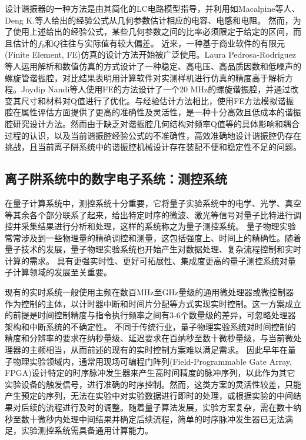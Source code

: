 设计谐振器的一种方法是由其简化的LC电路模型指导，并利用如Macalpine等人\cite[]{Macalpine_Schildknecht_1959}、Deng K.等人\cite[]{Deng_Sun_Yuan_Xu_Zhang_Lu_Luo_2014}给出的经验公式从几何参数估计相应的电容、电感和电阻。
然而，为了使用上述给出的经验公式，某些几何参数之间的比率必须限定于给定的区间，而且估计的$f_0$和$Q$往往与实际值有较大偏差。
近来，一种基于商业软件的有限元(Finite Element, FE)仿真的设计方法开始被广泛使用。Laura Pedrosa-Rodriguez等人\cite[]{Pedrosa_Rodriguez_Outerelo_Gomez_Alcala_de_Vicente_Diaz_Otero_2018}运用解析和数值仿真的方式设计了一种稳定、高电压、高品质因数和低噪声的螺旋管谐振腔，对比结果表明用计算软件对实测样机进行仿真的精度高于解析方程。Joydip Nandi等人\cite[]{Nandi_Sikdar_Reza_Misra_Das_Ray_2020}使用FE的方法设计了一个20 MHz的螺旋谐振腔，并通过改变其尺寸和材料对Q值进行了优化。与经验估计方法相比，使用FE方法模拟谐振腔在属性评估方面提供了更高的准确性及灵活性，是一种十分高效且低成本的谐振腔研究设计方法。然而由于缺乏对谐振腔几何结构对频率Q值等的具体影响和耦合过程的认识，以及当前谐振腔经验公式的不准确性，高效准确地设计谐振腔仍存在挑战，且当前离子阱系统中的谐振腔机械设计存在装配不便和稳定性不足的问题。

\subsection[离子阱系统中的数字电子系统：测控系统]{离子阱系统中的数字电子系统：测控系统}
在量子计算系统中，测控系统十分重要，它将量子实验系统中的电学、光学、真空等其余各个部分联系了起来，给出特定时序的微波、激光等信号对量子比特进行调控并采集结果进行分析和处理，这样的系统称之为量子测控系统。
量子物理实验常常涉及到一些物理量的精确调控和测量，这包括强度上、时间上的精确性。随着量子技术的发展，量子物理实验系统也开始产生对数据处理、复杂流程控制和实时计算的需求。
具有更强实时性、更好可拓展性、集成度更高的量子测控系统对量子计算领域的发展至关重要。

现有的实时系统一般使用主频在数百MHz至GHz量级的通用微处理器或微控制器作为控制的主体，以计时器中断和时间片分配等方式实现实时控制。这一方案成立的前提是时间控制精度与指令执行频率之间有3-6个数量级的差异，可忽略处理器架构和中断系统的不确定性。
不同于传统行业，量子物理实验系统对时间控制的精度和分辨率的要求在纳秒量级、延迟要求在百纳秒至数十微秒量级\cite[]{Ryan_Johnson_Ristè_Donovan_Ohki_2017,Guo_Qin_Schulz_2023,junhua03}，与当前微处理器的主频相当，从而前述的现有的实时控制方案难以满足需求。
因此早年在量子物理实验领域内，通常用现场可编程门阵列(Field-Programmable Gate Array, FPGA)设计特定的时序脉冲发生器来产生高时间精度的脉冲序列，以此作为其它实验设备的触发信号，进行准确的时序控制。然而，这类方案的灵活性较差，只能产生预定的序列，无法在实验中对实验数据进行即时的处理，或根据实验的中间结果对后续的流程进行及时的调整\cite[]{junhua01}。随着量子算法发展，实验方案复杂，需在数十纳秒至数十微秒内处理中间结果并确定后续流程，简单的时序脉冲发生器已无法满足，实验测控系统需具备通用计算能力。

